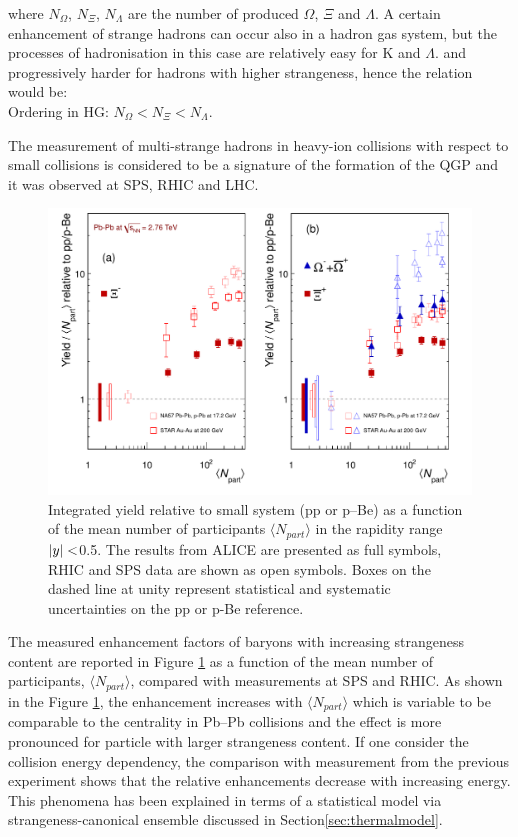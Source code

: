 where $N_{\Omega}$, $N_{\Xi}$, $N_{\Lambda}$ are the number of produced $\Omega$, $\Xi$ and $\Lambda$. A certain enhancement of strange hadrons can occur also in a hadron gas system, but the processes of hadronisation in this case are relatively easy for K and  $\Lambda$. and progressively harder for hadrons with higher strangeness, hence the relation would be: \\
Ordering in HG: $N_{\Omega} <  N_{\Xi} < N_{\Lambda}$.

The measurement of multi-strange hadrons in heavy-ion collisions with respect to small collisions is considered to be a signature of the formation of the QGP and it was observed at SPS, RHIC and LHC. \cite{cite:strangePbPb}


\begin{figure}[htbp]
\begin{center}
\includegraphics[width=12.cm]{./Version1/FigChapter3/MultdNdy}
\caption{Integrated yield relative to small system (pp or p--Be) as a function of the mean number of participants  $\langle N_{part}\rangle$ in the rapidity range $\arrowvert y \arrowvert<$0.5. The results from ALICE are presented as full symbols, RHIC and SPS data are shown as open symbols. Boxes on the dashed line at unity represent statistical and systematic uncertainties on the pp or p-Be reference.}
\label{fig:dNdy}
\end{center}
\end{figure}


The measured enhancement factors of baryons with increasing strangeness content are reported in Figure \ref{fig:dNdy} as a function of the mean number of participants, $\langle N_{part}\rangle$, compared with measurements at SPS and RHIC. 
As shown in the Figure \ref{fig:dNdy}, the enhancement increases with $\langle N_{part}\rangle$ which is variable to be comparable to the centrality in Pb--Pb collisions and the effect is more pronounced for particle with larger strangeness content. If one consider the collision energy dependency, the comparison with measurement from the previous experiment shows that the relative enhancements decrease with increasing energy. This phenomena has been explained in terms of a statistical model via strangeness-canonical ensemble discussed in Section\ref{sec:thermalmodel}.

